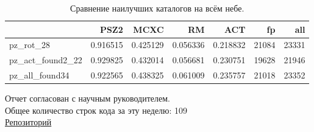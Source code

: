 \documentclass{article}
\begin{document}
\begin{table}
\begin{tabular}{lrrrrrr}
\toprule
{} &      PSZ2 &      MCXC &        RM &       ACT &     fp &    all \\
\midrule
pz\_rot\_28        &  0.916515 &  0.425129 &  0.056336 &  0.218832 &  21084 &  23331 \\
pz\_act\_found2\_22 &  0.929825 &  0.432014 &  0.056681 &  0.230751 &  19628 &  21946 \\
pz\_all\_found34   &  0.922565 &  0.438325 &  0.061009 &  0.235757 &  21018 &  23352 \\
\bottomrule
\end{tabular}
\caption{Сравнение наилучших каталогов на всём небе.}
\end{table}

Отчет согласован с научным руководителем.\\
Общее количество строк кода за эту неделю: 109\\
\href{https://github.com/rt2122/data-segmentation-2}{Репозиторий}\\ 
\end{document}
